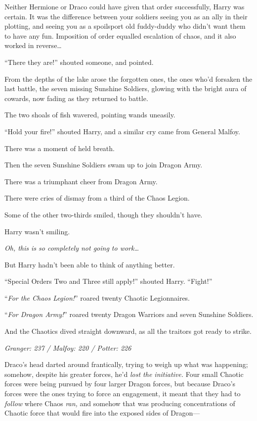 Neither Hermione or Draco could have given that order successfully, Harry was certain. It was the difference between your soldiers seeing you as an ally in their plotting, and seeing you as a spoilsport old fuddy-duddy who didn’t want them to have any fun. Imposition of order equalled escalation of chaos, and it also worked in reverse…

“There they are!” shouted someone, and pointed.

From the depths of the lake arose the forgotten ones, the ones who’d forsaken the last battle, the seven missing Sunshine Soldiers, glowing with the bright aura of cowards, now fading as they returned to battle.

The two shoals of fish wavered, pointing wands uneasily.

“Hold your fire!” shouted Harry, and a similar cry came from General Malfoy.

There was a moment of held breath.

Then the seven Sunshine Soldiers swam up to join Dragon Army.

There was a triumphant cheer from Dragon Army.

There were cries of dismay from a third of the Chaos Legion.

Some of the other two-thirds smiled, though they shouldn’t have.

Harry wasn’t smiling.

\emph{Oh, this is so completely not going to work…}

But Harry hadn’t been able to think of anything better.

“Special Orders Two and Three still apply!” shouted Harry. “Fight!”

“\emph{For the Chaos Legion!}” roared twenty Chaotic Legionnaires.

“\emph{For Dragon Army!}” roared twenty Dragon Warriors and seven Sunshine Soldiers.

And the Chaotics dived straight downward, as all the traitors got ready to strike.

\later

\emph{Granger: 237 / Malfoy: 220 / Potter: 226}

Draco’s head darted around frantically, trying to weigh up what was happening; somehow, despite his greater forces, he’d \emph{lost the initiative.} Four small Chaotic forces were being pursued by four larger Dragon forces, but because Draco’s forces were the ones trying to force an engagement, it meant that they had to \emph{follow} where Chaos \emph{ran,} and somehow that was producing concentrations of Chaotic force that would fire into the exposed sides of Dragon—

